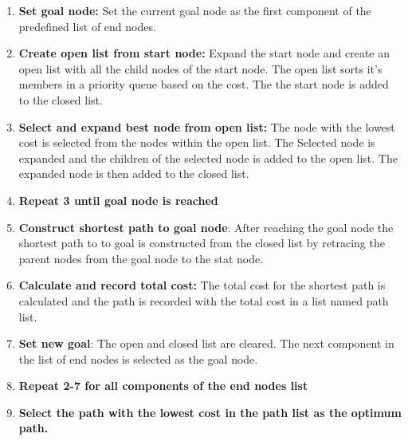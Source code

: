 \begin{enumerate}
\item \textbf{Set goal node:} Set the current goal node as the first component of the predefined list of end nodes. 
\item \textbf{Create open list from start node:} Expand the start node and create an open list with all the child nodes of the start node. The open list sorts it's members in a priority queue based on the cost. The the start node is added to the closed list.
\item \textbf{Select and expand best node from open list:} The node with the lowest cost is selected from the nodes within the open list. The Selected node is expanded and the children of the selected node is added to the open list. The expanded node is then added to the closed list.
\item \textbf{Repeat 3 until goal node is reached}
\item \textbf{Construct shortest path to goal node}: After reaching the goal node the shortest path to to goal is constructed from  the closed list by retracing the parent nodes from the goal node to the stat node.
\item \textbf{Calculate and record total cost:} The total cost for the shortest path is calculated and the path is recorded with the total cost in a list named path list.
\item \textbf{Set new goal}: The open and closed list are cleared. The next component in the list of end nodes is selected as the goal node.
\item \textbf{Repeat 2-7 for all components of the end nodes list}
\item \textbf{Select the path with the lowest cost in the path list as the optimum path.}
\end{enumerate}